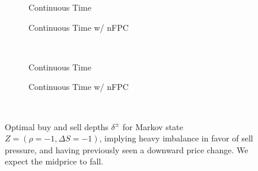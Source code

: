 \begin{figure}
\centering
\begin{subfigure}{.35\linewidth}
  \centering
  \setlength\figureheight{\linewidth} 
  \setlength\figurewidth{\linewidth}
  
  \caption{Continuous Time}
\end{subfigure}%
\hfil%
\begin{subfigure}{.35\linewidth}
  \centering
  \setlength\figureheight{\linewidth}
  \setlength\figurewidth{\linewidth}
   
  \caption{Continuous Time w/ nFPC}
\end{subfigure}\\
\vspace{1cm}
\begin{subfigure}{.35\linewidth}
  \centering
  \setlength\figureheight{\linewidth} 
  \setlength\figurewidth{\linewidth}
  
  \caption{Continuous Time}
\end{subfigure}%
\hfil%
\begin{subfigure}{.35\linewidth}
  \centering
  \setlength\figureheight{\linewidth}
  \setlength\figurewidth{\linewidth}
   
  \caption{Continuous Time w/ nFPC}
\end{subfigure}\\
\vspace{1cm}
\begin{subfigure}{\linewidth}
  \centering
   
\end{subfigure}%
  \caption{Optimal buy and sell depths $\delta^{\pm}$ for Markov state $Z=(\rho = -1, \Delta S = -1)$, implying heavy imbalance in favor of sell pressure, and having previously seen a downward price change. We expect the midprice to fall.}
  \label{fig:comp_calib_dm_z1}
\end{figure}

